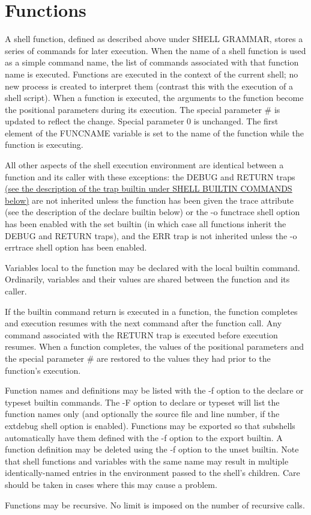 \section{Functions}\label{sec:functions}
A shell function, defined as described above under SHELL GRAMMAR, stores a series of commands for later execution. When the name of a shell function is used as a simple command name, the list of commands associated with that function name is executed. Functions are executed in the context of the current shell; no new process is created to interpret them (contrast this with the execution of a shell script). When a function is executed, the arguments to the function become the positional parameters during its execution. The special parameter \# is updated to reflect the change. Special parameter 0 is unchanged. The first element of the FUNCNAME variable is set to the name of the function while the function is executing.

All other aspects of the shell execution environment are identical between a function and its caller with these exceptions: the DEBUG and RETURN traps \hyperref[sec:shellbuiltincommands]{(see the description of the trap builtin under SHELL BUILTIN COMMANDS below)} are not inherited unless the function has been given the trace attribute (see the description of the declare builtin below) or the -o functrace shell option has been enabled with the set builtin (in which case all functions inherit the DEBUG and RETURN traps), and the ERR trap is not inherited unless the -o errtrace shell option has been enabled.

Variables local to the function may be declared with the local builtin command. Ordinarily, variables and their values are shared between the function and its caller.

If the builtin command return is executed in a function, the function completes and execution resumes with the next command after the function call. Any command associated with the RETURN trap is executed before execution resumes. When a function completes, the values of the positional parameters and the special parameter \# are restored to the values they had prior to the function's execution.

Function names and definitions may be listed with the -f option to the declare or typeset builtin commands. The -F option to declare or typeset will list the function names only (and optionally the source file and line number, if the extdebug shell option is enabled). Functions may be exported so that subshells automatically have them defined with the -f option to the export builtin. A function definition may be deleted using the -f option to the unset builtin. Note that shell functions and variables with the same name may result in multiple identically-named entries in the environment passed to the shell's children. Care should be taken in cases where this may cause a problem.

Functions may be recursive. No limit is imposed on the number of recursive calls.